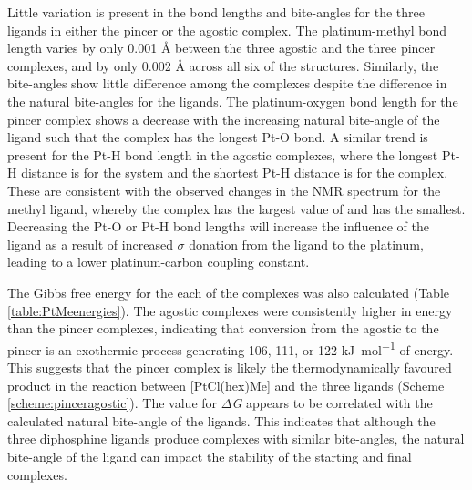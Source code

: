 Little variation is present in the bond lengths and bite-angles for the three ligands in either the pincer or the agostic complex.  The platinum-methyl bond length varies by only 0.001 \si{\angstrom} between the three agostic and the three pincer complexes, and by only 0.002 \si{\angstrom} across all six of the structures.  Similarly, the bite-angles show little difference among the complexes despite the difference in the natural bite-angles for the ligands.  The platinum-oxygen bond length for the pincer complex shows a decrease with the increasing natural bite-angle of the ligand such that the \tBusixantphos{} complex has the longest Pt-O bond.  A similar trend is present for the Pt-H bond length in the agostic complexes, where the longest Pt-H distance is for the \tBusixantphos{} system and the shortest Pt-H distance is for the \tBuxantphos{} complex.  These are consistent with the observed changes in the \carbon{} NMR spectrum for the methyl ligand, whereby the \tBusixantphos{} complex has the largest value of \JPtC{} and \tBuxantphos{} has the smallest.  Decreasing the Pt-O or Pt-H bond lengths will increase the \trans{} influence of the ligand as a result of increased $\sigma$ donation from the ligand to the platinum, leading to a lower platinum-carbon coupling constant.  

The Gibbs free energy for the each of the complexes was also calculated (Table \ref{table:PtMeenergies}).  The agostic complexes were consistently higher in energy than the pincer complexes, indicating that conversion from the agostic to the pincer is an exothermic process generating 106, 111, or 122 \si{\kilo\joule\per\mole} of energy.  This suggests that the pincer complex is likely the thermodynamically favoured product in the reaction between [PtCl(\acrshort{hex})Me] and the three \tBuxantphos{} ligands (Scheme \ref{scheme:pinceragostic}).  The value for $\Delta$\emph{G} appears to be correlated with the calculated natural bite-angle of the ligands.  This indicates that although the three diphosphine ligands produce complexes with similar bite-angles, the natural bite-angle of the ligand can impact the stability of the starting and final complexes.  


